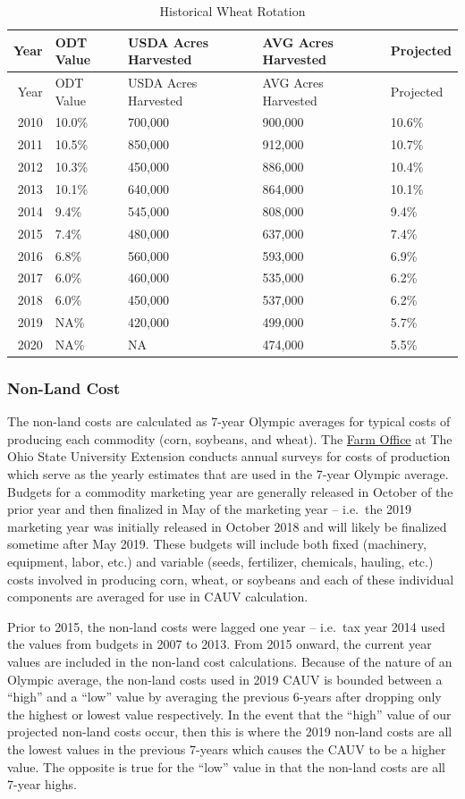 \documentclass[]{article}
\begin{document}
\begin{longtable}[]{@{}rllll@{}}
\caption{Historical Wheat Rotation}\tabularnewline
\toprule
Year & ODT Value & USDA Acres Harvested & AVG Acres Harvested &
Projected\tabularnewline
\midrule
\endfirsthead
\toprule
Year & ODT Value & USDA Acres Harvested & AVG Acres Harvested &
Projected\tabularnewline
\midrule
\endhead
2010 & 10.0\% & 700,000 & 900,000 & 10.6\%\tabularnewline
2011 & 10.5\% & 850,000 & 912,000 & 10.7\%\tabularnewline
2012 & 10.3\% & 450,000 & 886,000 & 10.4\%\tabularnewline
2013 & 10.1\% & 640,000 & 864,000 & 10.1\%\tabularnewline
2014 & 9.4\% & 545,000 & 808,000 & 9.4\%\tabularnewline
2015 & 7.4\% & 480,000 & 637,000 & 7.4\%\tabularnewline
2016 & 6.8\% & 560,000 & 593,000 & 6.9\%\tabularnewline
2017 & 6.0\% & 460,000 & 535,000 & 6.2\%\tabularnewline
2018 & 6.0\% & 450,000 & 537,000 & 6.2\%\tabularnewline
2019 & NA\% & 420,000 & 499,000 & 5.7\%\tabularnewline
2020 & NA\% & NA & 474,000 & 5.5\%\tabularnewline
\bottomrule
\end{longtable}

\hypertarget{non-land-cost}{%
\subsubsection{Non-Land Cost}\label{non-land-cost}}

The non-land costs are calculated as 7-year Olympic averages for typical
costs of producing each commodity (corn, soybeans, and wheat). The
\href{https://farmoffice.osu.edu/farm-management-tools/farm-budgets}{Farm
Office} at The Ohio State University Extension conducts annual surveys
for costs of production which serve as the yearly estimates that are
used in the 7-year Olympic average. Budgets for a commodity marketing
year are generally released in October of the prior year and then
finalized in May of the marketing year -- i.e.~the 2019 marketing year
was initially released in October 2018 and will likely be finalized
sometime after May 2019. These budgets will include both fixed
(machinery, equipment, labor, etc.) and variable (seeds, fertilizer,
chemicals, hauling, etc.) costs involved in producing corn, wheat, or
soybeans and each of these individual components are averaged for use in
CAUV calculation.

Prior to 2015, the non-land costs were lagged one year -- i.e.~tax year
2014 used the values from budgets in 2007 to 2013. From 2015 onward, the
current year values are included in the non-land cost calculations.
Because of the nature of an Olympic average, the non-land costs used in
2019 CAUV is bounded between a ``high'' and a ``low'' value by averaging
the previous 6-years after dropping only the highest or lowest value
respectively. In the event that the ``high'' value of our projected
non-land costs occur, then this is where the 2019 non-land costs are all
the lowest values in the previous 7-years which causes the CAUV to be a
higher value. The opposite is true for the ``low'' value in that the
non-land costs are all 7-year highs.
\end{document}
